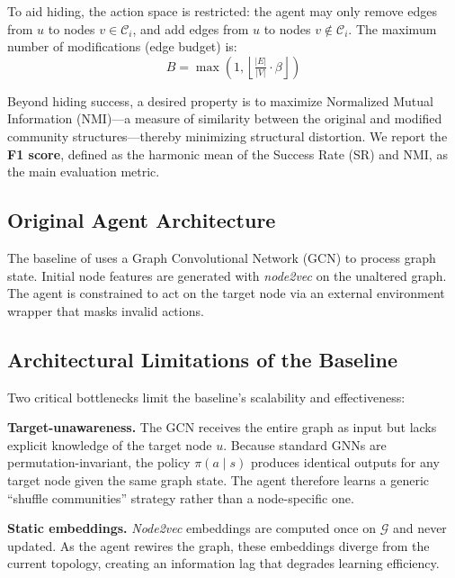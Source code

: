 \documentclass[twocolumn,a4paper]{article}
\begin{document}
To aid hiding, the action space is restricted: the agent may only remove edges
from $u$ to nodes $v \in \mathcal{C}_i$, and add edges from $u$ to nodes
$v \notin \mathcal{C}_i$. The maximum number of modifications (edge budget) is:
\[
  B = \max\!\left(1,\left\lfloor \tfrac{|E|}{|V|} \cdot \beta \right\rfloor\right)
\]

Beyond hiding success, a desired property is to maximize Normalized Mutual
Information (NMI)—a measure of similarity between the original and modified
community structures—thereby minimizing structural distortion. We report the
\textbf{F1 score}, defined as the harmonic mean of the Success Rate (SR) and
NMI, as the main evaluation metric.

\subsection{Original Agent Architecture}

The baseline of \parencite{bernini-2024} uses a Graph Convolutional Network
(GCN) \parencite{kipf2017semisupervisedclassificationgraphconvolutional} to
process graph state. Initial node features are generated with \textit{node2vec}
\parencite{grover2016node2vecscalablefeaturelearning} on the unaltered graph.
The agent is constrained to act on the target node via an external environment
wrapper that masks invalid actions.

\subsection{Architectural Limitations of the Baseline}

Two critical bottlenecks limit the baseline's scalability and effectiveness:

\textbf{Target-unawareness.} The GCN receives the entire graph as input but
lacks explicit knowledge of the target node $u$. Because standard GNNs are
permutation-invariant, the policy $\pi(a \mid s)$ produces identical outputs
for any target node given the same graph state. The agent therefore learns a
generic ``shuffle communities'' strategy rather than a node-specific one.

\textbf{Static embeddings.} \textit{Node2vec} embeddings are computed once on
$\mathcal{G}$ and never updated. As the agent rewires the graph, these
embeddings diverge from the current topology, creating an information lag that
degrades learning efficiency.


\end{document}
